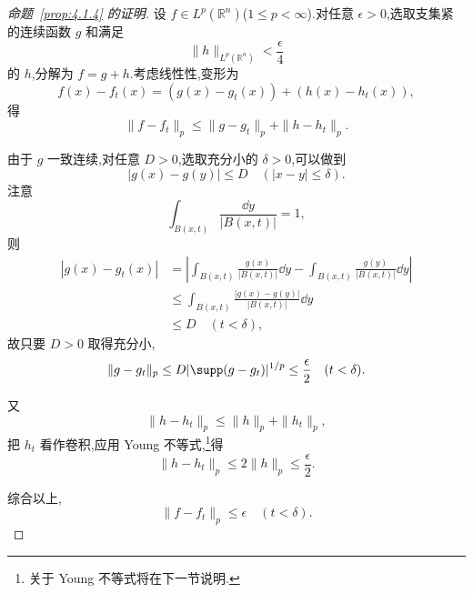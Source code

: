 \begin{proof}[命题~\ref{prop:4.1.4} 的证明]
设 $f \in L^{p}(\mathbb{R}^{n})$($1 \leq p < \infty$).对任意 $\epsilon > 0$,选取支集紧的连续函数 $g$ 和满足
\begin{equation*}
\|h\|_{L^{p}(\mathbb{R}^{n})} < \frac{\epsilon}{4}
\end{equation*}
的 $h$,分解为 $f = g + h$.考虑线性性,变形为
\begin{equation*}
f(x) - f_{t}(x) = \left(g(x) - g_{t}(x)\right) + \left(h(x) - h_{t}(x)\right),
\end{equation*}
得
\begin{equation*}
\|f - f_{t}\|_{p} \leq \|g - g_{t}\|_{p} + \|h - h_{t}\|_{p}.
\end{equation*}

由于 $g$ 一致连续,对任意 $D > 0$,选取充分小的 $\delta > 0$,可以做到
\begin{equation*}
|g(x) - g(y)| \leq D \quad (|x - y| \leq \delta).
\end{equation*}
注意
\begin{equation*}
\int_{B(x,t)}\frac{\dd y}{|B(x,t)|} = 1,
\end{equation*}
则
\begin{equation}
\begin{aligned}
|g(x) - g_{t}(x)| & = \left|\int_{B(x,t)}\frac{g(x)}{|B(x,t)|}\dd y - \int_{B(x,t)}\frac{g(y)}{|B(x,t)|}\dd y\right| \\
& \leq \int_{B(x,t)}\frac{|g(x) - g(y)|}{|B(x,t)|}\dd y \\
& \leq D \quad (t < \delta),
\end{aligned}
\end{equation}
故只要 $D > 0$ 取得充分小,
\begin{equation*}
\|g - g_{t}\|_{p} \leq D|\supp(g - g_{t})|^{1/p} \leq \frac{\epsilon}{2} \quad (t < \delta).
\end{equation*}

又
\begin{equation*}
\|h - h_{t}\|_{p} \leq \|h\|_{p} + \|h_{t}\|_{p},
\end{equation*}
把 $h_{t}$ 看作卷积,应用 Young 不等式,\footnote{关于 Young 不等式将在下一节说明.}得
\begin{equation*}
\|h - h_{t}\|_{p} \leq 2\|h\|_{p} \leq \frac{\epsilon}{2}.
\end{equation*}

综合以上,
\begin{equation*}
\|f - f_{t}\|_{p} \leq \epsilon \quad (t < \delta).
\end{equation*}
\end{proof}
